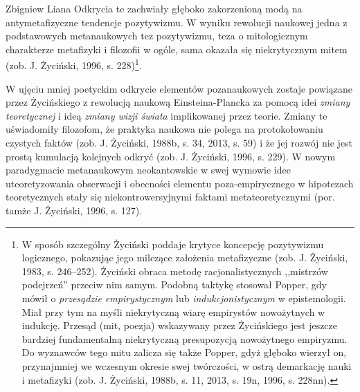 \begin{artplenv}{Zbigniew Liana}
Odkrycia te zachwiały głęboko zakorzenioną modą na antymetafizyczne tendencje pozytywizmu. W wyniku rewolucji naukowej
jedna z podstawowych metanaukowych tez pozytywizmu, teza o mitologicznym charakterze metafizyki i filozofii w ogóle,
sama okazała się niekrytycznym mitem \label{ref:RNDw5Xs923WOa}(zob. J. Życiński, 1996, s. 228)\footnote{W sposób
szczególny Życiński poddaje krytyce koncepcję pozytywizmu logicznego, pokazując jego milczące założenia metafizyczne
\label{ref:RNDk96fcXirdq}(zob. J. Życiński, 1983, s. 246–252). Życiński obraca metodę racjonalistycznych ,,mistrzów
podejrzeń'' przeciw nim samym. Podobną taktykę stosował Popper, gdy mówił o \textit{przesądzie empirystycznym} lub
\textit{indukcjonistycznym} w epistemologii. Miał przy tym na myśli niekrytyczną wiarę empirystów nowożytnych w indukcję.
Przesąd (mit, poezja) wskazywany przez Życińskiego jest jeszcze bardziej fundamentalną niekrytyczną presupozycją
nowożytnego empiryzmu. Do wyznawców tego mitu zalicza się także Popper, gdyż głęboko wierzył on, przynajmniej we
wczesnym okresie swej twórczości, w ostrą demarkację nauki i metafizyki \label{ref:RNDdtZAuOTDND}(zob. J. Życiński,
1988b, s. 11, 2013, s. 19n, 1996, s. 228nn). }.

W ujęciu mniej poetyckim odkrycie elementów pozanaukowych zostaje powiązane przez Życińskiego z rewolucją naukową
Einsteina-Plancka za pomocą idei \textit{zmiany teoretycznej} i ideą \textit{zmiany wizji świata} implikowanej przez
teorie. Zmiany te uświadomiły filozofom, że praktyka naukowa nie polega na protokołowaniu czystych faktów
\label{ref:RNDi0g21xRjLd}(zob. J. Życiński, 1988b, s. 34, 2013, s. 59) i że jej rozwój nie jest prostą kumulacją
kolejnych odkryć \label{ref:RNDl7y894RdpX}(zob. J. Życiński, 1996, s. 229). W nowym paradygmacie metanaukowym
neokantowskie w swej wymowie idee uteoretyzowania obserwacji i obecności elementu poza-empirycznego w hipotezach
teoretycznych stały się niekontrowersyjnymi faktami metateoretycznymi \label{ref:RNDLhcTxbq259}(por. tamże J. Życiński,
1996, s. 127).


\end{artplenv}
